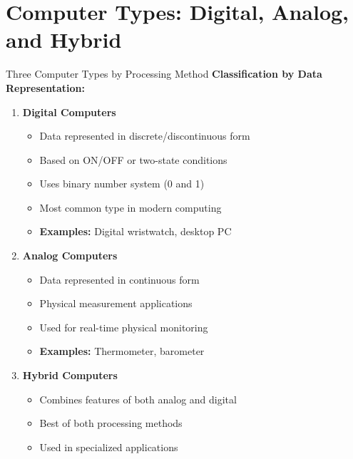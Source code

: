 \documentclass[aspectratio=169]{beamer}
\begin{document}
\section{Computer Types: Digital, Analog, and Hybrid}

\begin{frame}{Three Computer Types by Processing Method}
    \textbf{Classification by Data Representation:}
    
    \begin{enumerate}
        \item \textbf{Digital Computers}
        \begin{itemize}
            \item Data represented in discrete/discontinuous form
            \item Based on ON/OFF or two-state conditions
            \item Uses binary number system (0 and 1)
            
            \item Most common type in modern computing
            \item \textbf{Examples:} Digital wristwatch, desktop PC
        \end{itemize}
        
        \item \textbf{Analog Computers}
        \begin{itemize}
            \item Data represented in continuous form
            \item Physical measurement applications
            
            \item Used for real-time physical monitoring
            \item \textbf{Examples:} Thermometer, barometer
        \end{itemize}
        
        \item \textbf{Hybrid Computers}
        \begin{itemize}
            \item Combines features of both analog and digital
            \item Best of both processing methods
            \item Used in specialized applications
        \end{itemize}
    \end{enumerate}
\end{frame}
\end{document}
